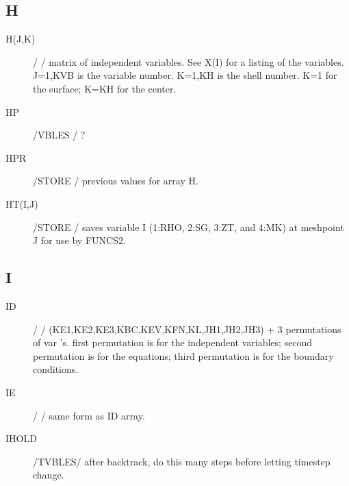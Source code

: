 \documentclass{article}
\begin{document}
\subsection*{H}
\begin{description}
	\item[H(J,K)]		/      / matrix of independent variables.   See X(I) for a listing of the variables.
					J=1,KVB is the variable number.
					K=1,KH is the shell number.
					K=1 for the surface; K=KH for the center.
	
	\item[HP]      	/VBLES / ?
	
	\item[HPR]		    /STORE / previous values for array H.

	\item[HT(I,J)]		/STORE / saves variable I (1:RHO, 2:SG, 3:ZT, and 4:MK) at meshpoint J for use by FUNCS2.

\end{description}
\subsection*{I}
\begin{description}
	\item[ID]      	/      / (KE1,KE2,KE3,KBC,KEV,KFN,KL,JH1,JH2,JH3) +  3 permutations of var 's.
	            	first permutation is for the independent variables;
	           	    second permutation is for the equations;
	           	    third permutation is for the boundary conditions.

    \item[IE]     	 	/      / same form as ID array.

	\item[IHOLD]		/TVBLES/ after backtrack, do this many steps before letting timestep change.

\end{description}
\end{document}

